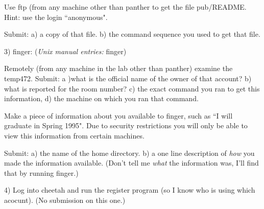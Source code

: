 Use ftp (from any machine other than {\ltt{}panther} to get the file 
pub/README.
Hint: use the login ``anonymous".

Submit: 
a) a copy of that file.
b) the command sequence you used to get that file.

3) finger:
({\it Unix manual entries:} {\ltt{}finger})

Remotely (from any machine in the lab other than {\ltt{}panther})
examine the {\ltt{}temp472}.
Submit: a )what is the official name of the 
owner of that account? b) what is reported for the room number?
c) the exact command you ran to get this information,
d) the machine on which you ran that command.

Make a piece of information about you available to finger,
such as ``I will graduate in Spring 1995". 
Due to security restrictions you will only be able to view this information
from certain machines.

Submit:
a) the name of the home directory.
b) a one line description of {\it how} you made the information available.
(Don't tell me {\it what} the information was, 
I'll find that by running finger.)

4) Log into cheetah and run the {\ltt{}register} program
(so I know who is using which acocunt). (No submission on this one.)

\bye
